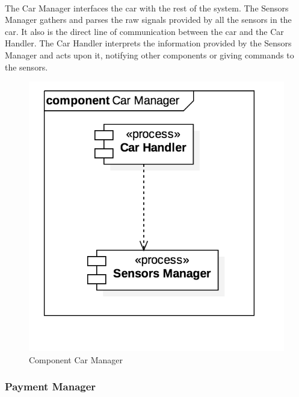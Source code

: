 		\paragraph{} The Car Manager interfaces the car with the rest of the system. The Sensors Manager gathers and parses the raw signals provided by all the sensors in the car. It also is the direct line of communication between the car and the Car Handler. The Car Handler interprets the information provided by the Sensors Manager and acts upon it, notifying other components or giving commands to the sensors.
		 \begin{figure}[h]
				\includegraphics[scale=0.4, center]{img/component_diagrams/07_car_manager.png}
				\caption{Component Car Manager}
			\end{figure}
\FloatBarrier
		
		
		
		
		\subsubsection*{Payment Manager}
			
			
